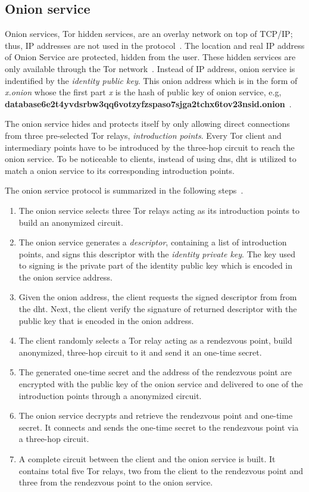 \subsection{Onion service}
%
Onion services, Tor hidden services, are an overlay network on top of TCP/IP;
thus, IP addresses are not used in the protocol~\cite{web:onion_service}. The
location and real IP address of Onion Service are protected, hidden from the
user. These hidden services are only available through the Tor network~\cite{paper:tor_design}.
Instead of IP address, onion service is indentified by the \emph{identity public key}.
This onion address which is in the form of \emph{x.onion} whose the first part \emph{x} is
the hash of public key of onion service, e.g, {\scriptsize \textbf{
database6e2t4yvdsrbw3qq6votzyfzspaso7sjga2tchx6tov23nsid.onion}}~\cite{dis:usage_of_onion_services}.

The onion service hides and protects itself by only allowing direct connections
from three pre-selected Tor relays, \emph{introduction points}. Every Tor client
and intermediary points have to be introduced by the three-hop circuit to reach
the onion service.
To be noticeable to clients, instead of using \gls{dns}, \gls{dht} is utilized
to match a onion service to its corresponding introduction points.

The onion service protocol is summarized in the following steps~\cite{paper:tor_design,
web:onion_service}.
\begin{enumerate}
    \item The onion service selects three Tor relays acting as its introduction
    points to build an anonymized circuit.
    \item The onion service generates a \emph{descriptor}, containing a list of
    introduction points, and signs this descriptor with the \emph{identity private
    key}. The key used to signing is the private part of the identity public key
    which is encoded in the onion service address.
    \item Given the onion address, the client requests the signed descriptor from
    from the \acrshort{dht}. Next, the client verify the signature of returned
    descriptor with the public key that is encoded in the onion address.
    \item The client randomly selects a Tor relay acting as a rendezvous point,
    build anonymized, three-hop circuit to it and send it an one-time secret.
    \item The generated one-time secret and the address of the rendezvous point
    are encrypted with the public key of the onion service and delivered to one of
    the introduction points through a anonymized circuit.
    \item The onion service decrypts and retrieve the rendezvous point and one-time
    secret. It connects and sends the one-time secret to the rendezvous point via
    a three-hop circuit.
    \item A complete circuit between the client and the onion service is built.
    It contains total five Tor relays, two from the client to the rendezvous point
    and three from the rendezvous point to the onion service. 
\end{enumerate}

